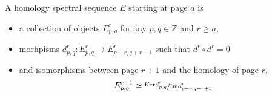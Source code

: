 \documentclass[../thesis.tex]{subfiles}
\begin{document}
        \begin{definition}
            A homology spectral sequence $E$ starting at page $a$ is
            \begin{itemize}
                \item a collection of objects $E^r_{p,q}$ for any $p,q \in \mathbb{Z}$ and $r \geq a$,
                \item morhpisms $d^r_{p,q} : E^r_{p,q} \rightarrow E^r_{p-r,q+r-1}$ such that $d^r\circ d^r = 0$
                \item and isomorphisms between page $r+1$ and the homology of page $r$,
                \begin{align*}
                    E^{r+1}_{p,q} \simeq \sfrac{\text{Ker}d^r_{p,q}}{\text{Im}d^r_{p+r,q-r+1}}\text{.}
                \end{align*}
            \end{itemize}
        \end{definition}
\end{document}
